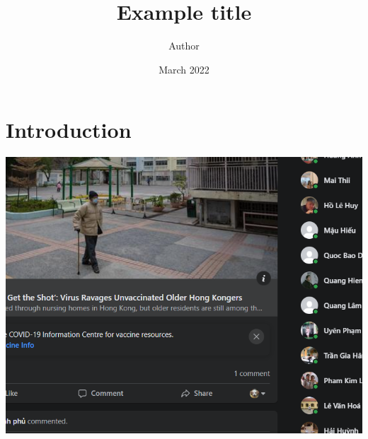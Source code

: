 \documentclass{article}
\title{Example title}
\author{Author}
\date{March 2022}
\begin{document}
\maketitle

\section{Introduction}

\includegraphics[scale=1]{UI88u}
\end{document}
